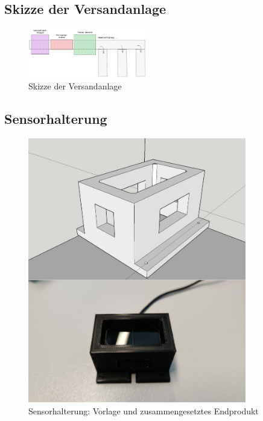 \newpage
\subsection{Skizze der Versandanlage}

\begin{figure}[htpb]
  \centering
  \includegraphics[angle=90,origin=c,width=0.46\textwidth]{./pics/Versandanlage.png}
  \caption{Skizze der Versandanlage}
  \label{appendix:fig:skizzeVersand}
\end{figure}


\newpage
\subsection{Sensorhalterung}

\begin{figure}[htpb]
  \centering
  \includegraphics[width=0.85\textwidth]{./pics/thingiverse_3D.png}
  \caption{Sensorhalterung: Vorlage \autocite{thingiverse} und zusammengesetztes Endprodukt}
  \label{appendix:fig:thingiverse}
\end{figure}


